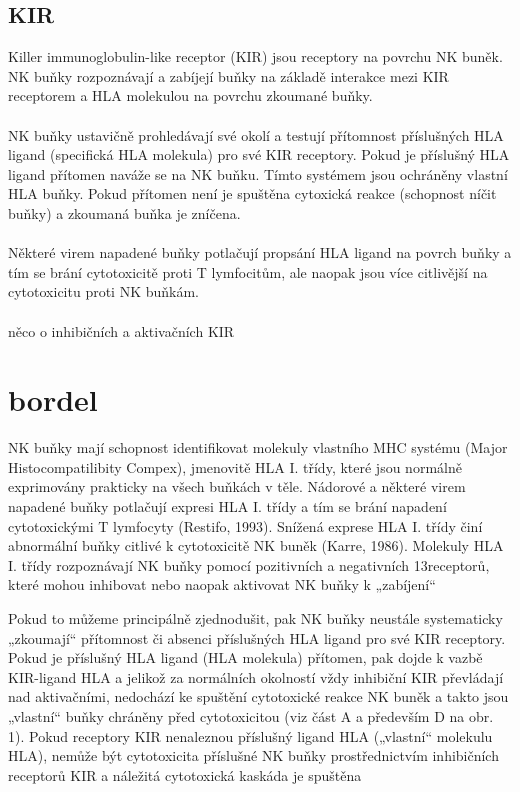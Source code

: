 \documentclass[czech,DP]{thesiskiv}
\begin{document}
\subsection{KIR}
Killer immunoglobulin-like receptor (KIR) jsou receptory na povrchu NK buněk. NK buňky rozpoznávají a zabíjejí buňky na základě interakce mezi KIR receptorem a HLA molekulou na povrchu zkoumané buňky. 
\\
\\
NK buňky ustavičně prohledávají své okolí a testují přítomnost příslušných HLA ligand (specifická HLA molekula) pro své KIR receptory. Pokud je příslušný HLA ligand přítomen naváže se na NK buňku. Tímto systémem jsou ochráněny vlastní HLA buňky. Pokud přítomen není je spuštěna cytoxická reakce (schopnost níčit buňky) a zkoumaná buňka je zníčena.   
\\
\\
Některé virem napadené buňky potlačují propsání HLA ligand na povrch buňky a tím se brání cytotoxicitě proti T lymfocitům, ale naopak jsou více citlivější na cytotoxicitu proti NK buňkám.
\\
\\
něco o inhibičních a aktivačních KIR






\section{bordel}
NK buňky mají schopnost identifikovat molekuly vlastního MHC systému (Major
Histocompatilibity Compex), jmenovitě HLA I. třídy, které jsou normálně exprimovány
prakticky na všech buňkách v těle. Nádorové a některé virem napadené buňky potlačují
expresi HLA I. třídy a tím se brání napadení cytotoxickými T lymfocyty (Restifo, 1993).
Snížená exprese HLA I. třídy činí abnormální buňky citlivé k cytotoxicitě NK buněk (Karre,
1986). Molekuly HLA I. třídy rozpoznávají NK buňky pomocí pozitivních a negativních
13receptorů, které mohou inhibovat nebo naopak aktivovat NK buňky k „zabíjení“

Pokud to můžeme principálně zjednodušit, pak NK buňky neustále
systematicky „zkoumají“ přítomnost či absenci příslušných HLA
ligand pro své KIR receptory. Pokud je příslušný HLA ligand (HLA
molekula) přítomen, pak dojde k vazbě KIR-ligand HLA a jelikož za
normálních okolností vždy inhibiční KIR převládají nad aktivačními,
nedochází ke spuštění cytotoxické reakce NK buněk a takto jsou
„vlastní“ buňky chráněny před cytotoxicitou (viz část A a především D
na obr. 1). Pokud receptory KIR nenaleznou příslušný ligand HLA
(„vlastní“ molekulu HLA), nemůže být cytotoxicita příslušné NK buňky
prostřednictvím inhibičních receptorů KIR a náležitá cytotoxická
kaskáda je spuštěna
\end{document}
